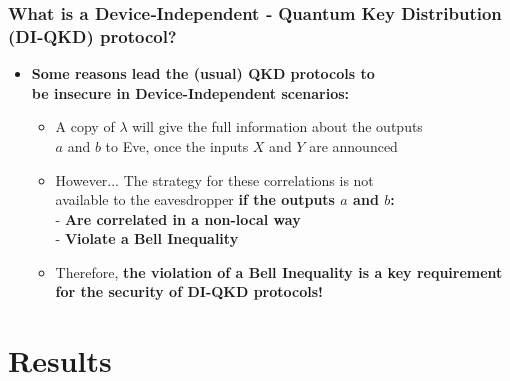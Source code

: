 \documentclass{beamer}
\begin{document}
    \begin{frame}
        \frametitle{\footnotesize What is a Device‑Independent ‑ Quantum Key Distribution (DI‑QKD) protocol?}

        \vspace{1ex}
        \begin{itemize}
            \item \textbf{Some reasons lead the (usual) QKD protocols to\\ be insecure in Device-Independent scenarios:}
            \begin{itemize}
                \item A copy of $\lambda$ will give the full information about the outputs\\ $a$ and $b$ to Eve, once the inputs $X$ and $Y$ are announced
                \vspace{1ex}
                \item However... The strategy for these correlations is not\\ available to the eavesdropper \textbf{if the outputs $a$ and $b$:}\\
                - \textbf{Are correlated in a non-local way}\\
                - \textbf{Violate a Bell Inequality}
                \vspace{1ex}
                \item Therefore, \textbf{the violation of a Bell Inequality is a key requirement for the security of DI-QKD protocols!}
            \end{itemize}
        \end{itemize}
    \end{frame}


    \section{Results}
\end{document}
